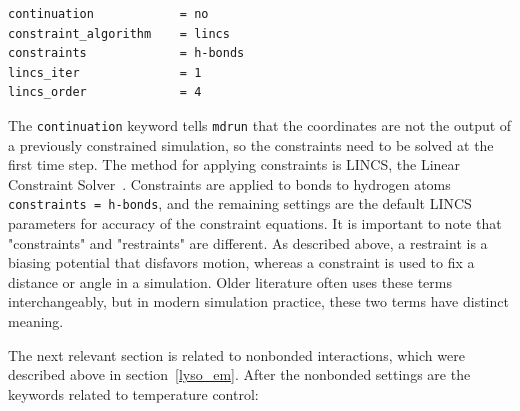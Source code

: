 \documentclass[9pt,tutorial,pubversion]{livecoms}
\begin{document}
\begin{lstlisting}
continuation            = no
constraint_algorithm    = lincs
constraints             = h-bonds
lincs_iter              = 1
lincs_order             = 4
\end{lstlisting}
%
The \texttt{continuation} keyword tells \texttt{mdrun} that the coordinates are not the output of a previously constrained simulation, so the constraints need to be solved at the first time step. The method for applying constraints is LINCS, the Linear Constraint Solver~\cite{Hess1997,Hess2008b}. Constraints are applied to bonds to hydrogen atoms \texttt{constraints = h-bonds}, and the remaining settings are the default LINCS parameters for accuracy of the constraint equations. It is important to note that "constraints" and "restraints" are different. As described above, a restraint is a biasing potential that disfavors motion, whereas a constraint is used to fix a distance or angle in a simulation. Older literature often uses these terms interchangeably, but in modern simulation practice, these two terms have distinct meaning.

The next relevant section is related to nonbonded interactions, which were described above in section~\ref{lyso_em}. After the nonbonded settings are the keywords related to temperature control:
\end{document}
